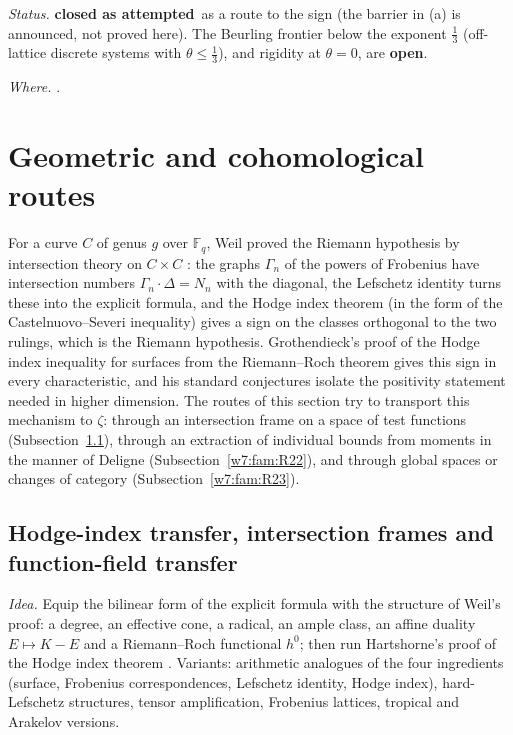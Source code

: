 \documentclass[11pt]{amsart}
\theoremstyle{definition}
\theoremstyle{remark}
\numberwithin{equation}{section}
\newcommand{\rtag}[1]{\textbf{\small\textsf{#1}}}
\newcommand{\closedA}{\rtag{closed as attempted}}
\newcommand{\openR}{\rtag{open}}
\newcommand{\entry}[1]{\par\smallskip\noindent\textit{#1.}\enspace}
\begin{document}
\entry{Status} \closedA\ as a route to the sign (the barrier in (a) is announced, not proved here). The
Beurling frontier below the exponent $\frac13$ (off-lattice discrete systems with $\theta\le\frac13$), and
rigidity at $\theta=0$, are \openR.

\entry{Where} \cite{DMV2006,Zhang2007,DiamondZhang2016,BDR2023}.


\section{Geometric and cohomological routes}\label{w7:sec:geometry}

For a curve $C$ of genus $g$ over $\mathbb F_q$, Weil proved the Riemann hypothesis by intersection theory on
$C\times C$ \cite{Weil48}: the graphs $\Gamma_n$ of the powers of Frobenius have intersection numbers
$\Gamma_n\cdot\Delta=N_n$ with the diagonal, the Lefschetz identity turns these into the explicit formula, and
the Hodge index theorem (in the form of the Castelnuovo--Severi inequality) gives a sign on the classes
orthogonal to the two rulings, which is the Riemann hypothesis. Grothendieck's proof of the Hodge index inequality for surfaces from the Riemann--Roch theorem \cite{Grothendieck1958}
gives this sign in every characteristic, and his standard conjectures \cite{Grothendieck1969} isolate the positivity statement needed in higher dimension. The routes of this section
try to transport this mechanism to $\zeta$: through an intersection frame on a space of test functions
(Subsection~\ref{w7:fam:R21}), through an extraction of individual bounds from moments in the manner of
Deligne (Subsection~\ref{w7:fam:R22}), and through global spaces or changes of category
(Subsection~\ref{w7:fam:R23}).

\subsection{Hodge-index transfer, intersection frames and function-field transfer}\label{w7:fam:R21}

\entry{Idea} Equip the bilinear form of the explicit formula with the structure of Weil's proof: a degree, an
effective cone, a radical, an ample class, an affine duality $E\mapsto K-E$ and a Riemann--Roch functional
$h^0$; then run Hartshorne's proof of the Hodge index theorem \cite[Ch.~V, Theorem~1.9]{Hartshorne1977}. Variants: arithmetic analogues of the four
ingredients (surface, Frobenius correspondences, Lefschetz identity, Hodge index), hard-Lefschetz structures,
tensor amplification, Frobenius lattices, tropical and Arakelov versions.
\end{document}

